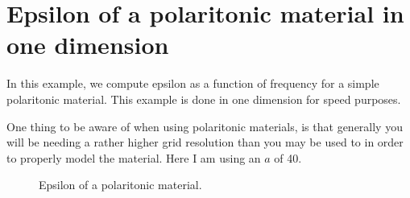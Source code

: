 \begin{comment}
#include <stdio.h>
#include <stdlib.h>
#include <signal.h>

#include "meep.h"
\end{comment}

\section{Epsilon of a polaritonic material in one dimension}

In this example, we compute epsilon as a function of frequency for a simple
polaritonic material.  This example is done in one dimension for speed
purposes.

One thing to be aware of when using polaritonic materials, is that
generally you will be needing a rather higher grid resolution than you may
be used to in order to properly model the material.  Here I am using an $a$
of 40.

\begin{figure}
\label{epsilon_polariton}
\caption{Epsilon of a polaritonic material.}
\end{figure}



